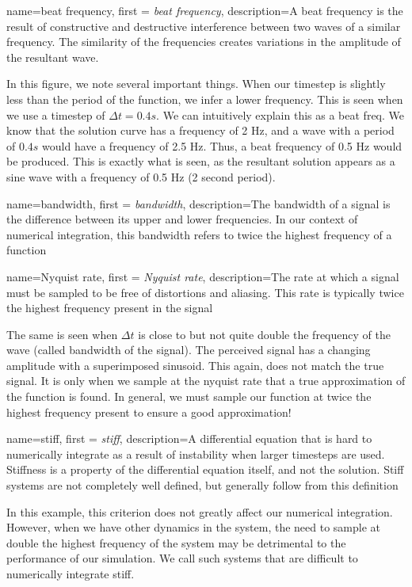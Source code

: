 \documentclass[12pt]{report}
\begin{document}
{
    name=beat frequency,
    first = {\textit{beat frequency}},
    description={A beat frequency is the result of constructive and destructive interference between two waves of a similar frequency. The similarity of the frequencies creates variations in the amplitude of the resultant wave.}
}

In this figure, we note several important things. When our timestep is slightly less than the period of the function, we infer a lower frequency. This is seen when we use a timestep of $\Delta t=0.4s$. We can intuitively explain this as a \gls{beat freq}. We know that the solution curve has a frequency of 2 Hz, and a wave with a period of $0.4 s$ would have a frequency of 2.5 Hz. Thus, a beat frequency of 0.5 Hz would be produced. This is exactly what is seen, as the resultant solution appears as a sine wave with a frequency of 0.5 Hz (2 second period). 

{
    name=bandwidth,
    first = {\textit{bandwidth}},
    description={The bandwidth of a signal is the difference between its upper and lower frequencies. In our context of numerical integration, this bandwidth refers to twice the highest frequency of a function}
}

{
    name=Nyquist rate,
    first = {\textit{Nyquist rate}},
    description={The rate at which a signal must be sampled to be free of distortions and aliasing. This rate is typically twice the highest frequency present in the signal}
}

The same is seen when $\Delta t$ is close to but not quite double the frequency of the wave (called \gls{bandwidth} of the signal). The perceived signal has a changing amplitude with a superimposed sinusoid. This again, does not match the true signal. It is only when we sample at the \gls{nyquist rate} that a true approximation of the function is found. In general, we must sample our function at twice the highest frequency present to ensure a good approximation!

{
    name=stiff,
    first = {\textit{stiff}},
    description={A differential equation that is hard to numerically integrate as a result of instability when larger timesteps are used. Stiffness is a property of the differential equation itself, and not the solution. Stiff systems are not completely well defined, but generally follow from this definition}
}

In this example, this criterion does not greatly affect our numerical integration. However, when we have other dynamics in the system, the need to sample at double the highest frequency of the system may be detrimental to the performance of our simulation. We call such systems that are difficult to numerically integrate \gls{stiff}. 
\end{document}
